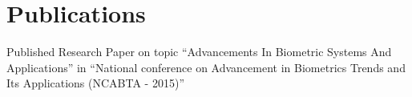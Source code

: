 \documentclass[]{hieudo-build}
\begin{document}
\begin{minipage}[t]{0.3\textwidth}

\sectionsep

%
%
\end{minipage} 
\hfill
\begin{minipage}[t]{0.69\textwidth} 







\section{Publications}

\descript{}
Published Research Paper on topic “Advancements In Biometric Systems And Applications” in “National conference on Advancement in Biometrics Trends and Its Applications (NCABTA - 2015)”	
\sectionsep





\end{minipage}
\end{document}

